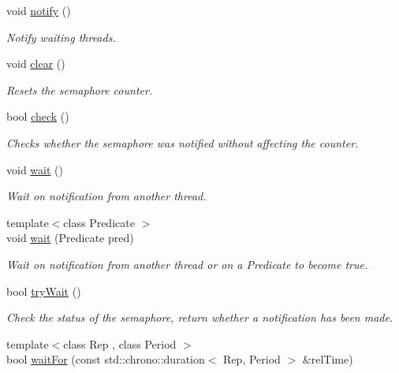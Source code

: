 \begin{DoxyCompactItemize}
\item 
void \hyperlink{classdg_1_1deepcore_1_1_semaphore_a4e5c2c00dc00990bf45bbe5481a41e79}{notify} ()
\begin{DoxyCompactList}\small\item\em Notify waiting threads. \end{DoxyCompactList}\item 
void \hyperlink{classdg_1_1deepcore_1_1_semaphore_ac472f96df82a6ee0ab69f60b7b787e73}{clear} ()
\begin{DoxyCompactList}\small\item\em Resets the semaphore counter. \end{DoxyCompactList}\item 
bool \hyperlink{classdg_1_1deepcore_1_1_semaphore_aea211c595501c6f7b2a2a33984247608}{check} ()
\begin{DoxyCompactList}\small\item\em Checks whether the semaphore was notified without affecting the counter. \end{DoxyCompactList}\item 
void \hyperlink{classdg_1_1deepcore_1_1_semaphore_a18a26421e8635a99c23ea817d66f5478}{wait} ()
\begin{DoxyCompactList}\small\item\em Wait on notification from another thread. \end{DoxyCompactList}\item 
{\footnotesize template$<$class Predicate $>$ }\\void \hyperlink{classdg_1_1deepcore_1_1_semaphore_a4a0c7baf7c9bd891106f767c36b504d5}{wait} (Predicate pred)
\begin{DoxyCompactList}\small\item\em Wait on notification from another thread or on a {\ttfamily Predicate} to become {\ttfamily true}. \end{DoxyCompactList}\item 
bool \hyperlink{classdg_1_1deepcore_1_1_semaphore_aceadffabf3157356feca0835800b7a07}{try\+Wait} ()
\begin{DoxyCompactList}\small\item\em Check the status of the semaphore, return whether a notification has been made. \end{DoxyCompactList}\item 
{\footnotesize template$<$class Rep , class Period $>$ }\\bool \hyperlink{classdg_1_1deepcore_1_1_semaphore_a35a6aa4e67436117f6242d144f15665a}{wait\+For} (const std\+::chrono\+::duration$<$ Rep, Period $>$ \&rel\+Time)

\end{DoxyCompactItemize}
